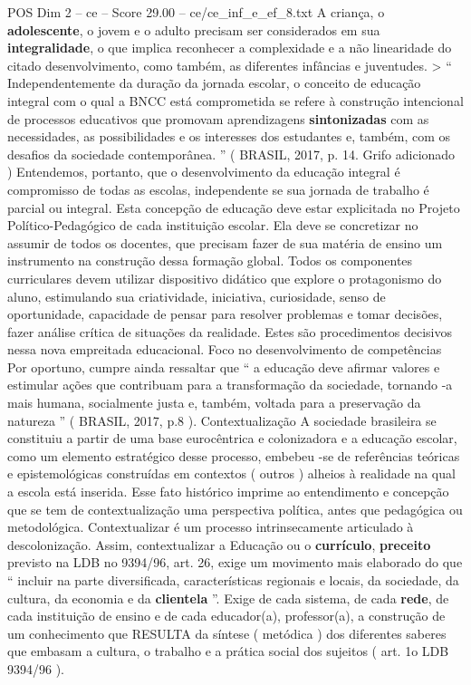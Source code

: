 \begin{textsample}{POS Dim 2 – ce – Score 29.00 – ce/ce\_inf\_e\_ef\_8.txt}
A criança, o \textbf{adolescente}, o jovem e o adulto precisam ser considerados em sua \textbf{integralidade}, o que implica reconhecer a complexidade e a não linearidade do citado desenvolvimento, como também, as diferentes infâncias e juventudes. > “ Independentemente da duração da jornada escolar, o conceito de educação integral com o qual a BNCC está comprometida se refere à construção intencional de processos educativos que promovam aprendizagens \textbf{sintonizadas} com as necessidades, as possibilidades e os interesses dos estudantes e, também, com os desafios da sociedade contemporânea. ” ( BRASIL, 2017, p. 14.
Grifo adicionado ) Entendemos, portanto, que o desenvolvimento da educação integral é compromisso de todas as escolas, independente se sua jornada de trabalho é parcial ou integral.
Esta concepção de educação deve estar explicitada no Projeto Político-Pedagógico de cada instituição escolar.
Ela deve se concretizar no assumir de todos os docentes, que precisam fazer de sua matéria de ensino um instrumento na construção dessa formação global.
Todos os componentes curriculares devem utilizar dispositivo didático que explore o protagonismo do aluno, estimulando sua criatividade, iniciativa, curiosidade, senso de oportunidade, capacidade de pensar para resolver problemas e tomar decisões, fazer análise crítica de situações da realidade.
Estes são procedimentos decisivos nessa nova empreitada educacional.
Foco no desenvolvimento de competências Por oportuno, cumpre ainda ressaltar que “ a educação deve afirmar valores e estimular ações que contribuam para a transformação da sociedade, tornando -a mais humana, socialmente justa e, também, voltada para a preservação da natureza ” ( BRASIL, 2017, p.8 ).
Contextualização A sociedade brasileira se constituiu a partir de uma base eurocêntrica e colonizadora e a educação escolar, como um elemento estratégico desse processo, embebeu -se de referências teóricas e epistemológicas construídas em contextos ( outros ) alheios à realidade na qual a escola está inserida.
Esse fato histórico imprime ao entendimento e concepção que se tem de contextualização uma perspectiva política, antes que pedagógica ou metodológica.
Contextualizar é um processo intrinsecamente articulado à descolonização.
Assim, contextualizar a Educação ou o \textbf{currículo}, \textbf{preceito} previsto na LDB no 9394/96, art. 26, exige um movimento mais elaborado do que “ incluir na parte diversificada, características regionais e locais, da sociedade, da cultura, da economia e da \textbf{clientela} ”.
Exige de cada sistema, de cada \textbf{rede}, de cada instituição de ensino e de cada educador(a), professor(a), a construção de um conhecimento que RESULTA da síntese ( metódica ) dos diferentes saberes que embasam a cultura, o trabalho e a prática social dos sujeitos ( art. 1o LDB 9394/96 ).

\end{textsample}
